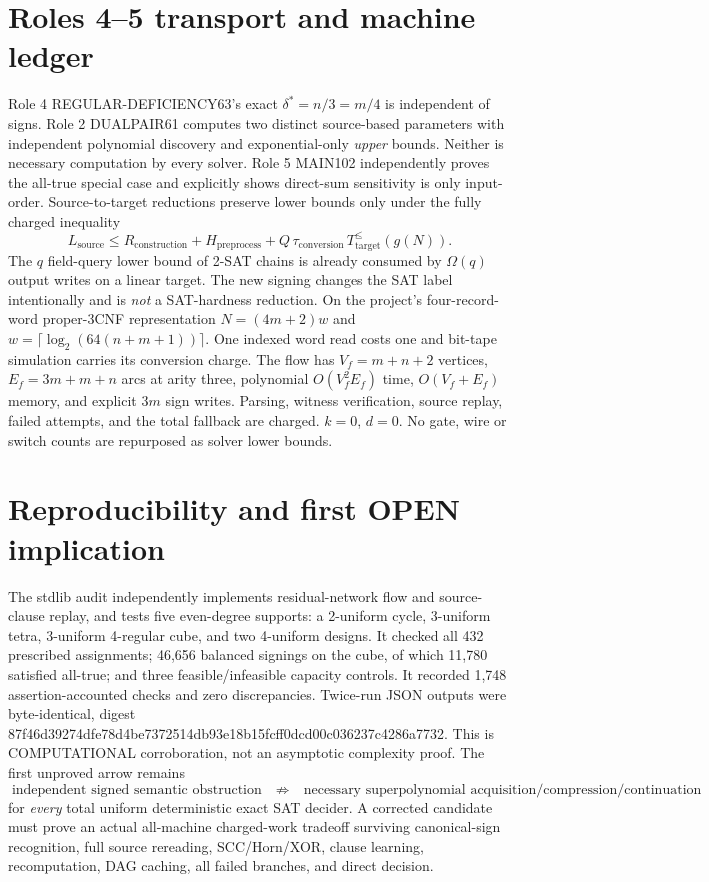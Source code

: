 \documentclass[11pt]{article}
\begin{document}
\section{Roles 4--5 transport and machine ledger}
Role 4 REGULAR-DEFICIENCY63's exact $\delta^*=n/3=m/4$ is independent of signs. Role 2 DUALPAIR61 computes two distinct source-based parameters with independent polynomial discovery and exponential-only \emph{upper} bounds. Neither is necessary computation by every solver. Role 5 MAIN102 independently proves the all-true special case and explicitly shows direct-sum sensitivity is only input-order. Source-to-target reductions preserve lower bounds only under the fully charged inequality
\[
L_{\mathrm{source}}\le R_{\mathrm{construction}}+H_{\mathrm{preprocess}}+
Q\,\tau_{\mathrm{conversion}}\, T_{\mathrm{target}}^{\le}(g(N)).
\]
The $q$ field-query lower bound of 2-SAT chains is already consumed by $\Omega(q)$ output writes on a linear target. The new signing changes the SAT label intentionally and is \emph{not} a SAT-hardness reduction.
On the project's four-record-word proper-3CNF representation $N=(4m+2)w$ and $w=\lceil\log_2(64(n+m+1))\rceil$. One indexed word read costs one and bit-tape simulation carries its conversion charge. The flow has $V_f=m+n+2$ vertices, $E_f=3m+m+n$ arcs at arity three, polynomial $O(V_f^2E_f)$ time, $O(V_f+E_f)$ memory, and explicit $3m$ sign writes. Parsing, witness verification, source replay, failed attempts, and the total fallback are charged. $k=0$, $d=0$. No gate, wire or switch counts are repurposed as solver lower bounds.
\section{Reproducibility and first OPEN implication}
The stdlib audit independently implements residual-network flow and source-clause replay, and tests five even-degree supports: a 2-uniform cycle, 3-uniform tetra, 3-uniform 4-regular cube, and two 4-uniform designs. It checked all 432 prescribed assignments; 46,656 balanced signings on the cube, of which 11,780 satisfied all-true; and three feasible/infeasible capacity controls. It recorded 1,748 assertion-accounted checks and zero discrepancies. Twice-run JSON outputs were byte-identical, digest 87f46d39274dfe78d4be7372514db93e18b15fcff0dcd00c036237c4286a7732. This is COMPUTATIONAL corroboration, not an asymptotic complexity proof.
The first unproved arrow remains
\[
\text{independent signed semantic obstruction}\quad
\not\Longrightarrow\quad
\text{necessary superpolynomial acquisition/compression/continuation}
\]
for \emph{every} total uniform deterministic exact SAT decider. A corrected candidate must prove an actual all-machine charged-work tradeoff surviving canonical-sign recognition, full source rereading, SCC/Horn/XOR, clause learning, recomputation, DAG caching, all failed branches, and direct decision.
\end{document}
